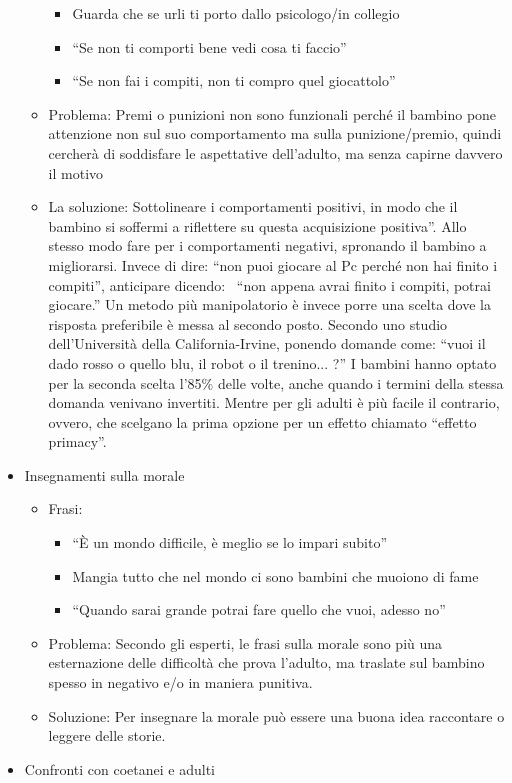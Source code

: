 \documentclass[12pt]{book} %
\begin{document}
\begin{itemize}
\begin{itemize}
\begin{itemize}
\item {\textquotedbl}Guarda che se urli ti porto dallo psicologo/in collegio{\textquotedbl}
\item “Se non ti comporti bene vedi cosa ti faccio”
\item “Se non fai i compiti, non ti compro quel giocattolo”
\end{itemize}
\item Problema: Premi o punizioni non sono funzionali perché il bambino pone attenzione non sul suo comportamento ma
sulla punizione/premio, quindi cercherà di soddisfare le aspettative dell'adulto, ma senza capirne
davvero il motivo
\item La soluzione: Sottolineare i comportamenti positivi, in modo che il bambino si soffermi a riflettere su questa
acquisizione positiva”. Allo stesso modo fare per i comportamenti negativi, spronando il bambino a migliorarsi. Invece
di dire: “non puoi giocare al Pc perché non hai finito i compiti”, anticipare dicendo: \ “non appena avrai finito i
compiti, potrai giocare.” Un metodo più manipolatorio è invece porre una scelta dove la risposta preferibile è messa al
secondo posto. Secondo uno studio dell'Università della California-Irvine, ponendo domande come: “vuoi il dado rosso o
quello blu, il robot o il trenino... ?” I bambini hanno optato per la seconda scelta l'85\% delle volte, anche quando i
termini della stessa domanda venivano invertiti. Mentre per gli adulti è più facile il contrario, ovvero, che scelgano
la prima opzione per un effetto chiamato “effetto primacy”. 
\end{itemize}
\item Insegnamenti sulla morale

\begin{itemize}
\item Frasi:

\begin{itemize}
\item “È un mondo difficile, è meglio se lo impari subito”
\item {\textquotedbl}Mangia tutto che nel mondo ci sono bambini che muoiono di fame{\textquotedbl}
\item “Quando sarai grande potrai fare quello che vuoi, adesso no”
\end{itemize}
\item Problema: Secondo gli esperti, le frasi sulla morale sono più una esternazione delle difficoltà che prova
l'adulto, ma traslate sul bambino spesso in negativo e/o in maniera punitiva.
\item Soluzione: Per insegnare la morale può essere una buona idea raccontare o leggere delle storie.
\end{itemize}
\item Confronti con coetanei e adulti


\end{itemize}
\end{document}
